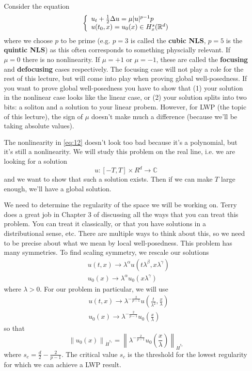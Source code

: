 \documentclass{article}
\def\R{\mathbb{R}} %
\newcommand\norm[1]{\left\lVert#1\right\rVert}
\begin{document}
Consider the equation
\begin{equation}\label{eq:12}
  \left\{ \begin{array}{l@{}l}
      u_{t}+ \frac{1}{2}\Delta u = \mu|u|^{p-1}p \\
      u(t_{0},x)=u_{0}(x)\in H_{x}^{s}(\R^d)
    \end{array}\right.
\end{equation}
where we choose $p$ to be prime (e.g. $p=3$ is called the \textbf{cubic NLS}, $p=5$ is
the \textbf{quintic NLS}) as this often corresponds to something physcially relevant. If
$\mu=0$ there is no nonlinearity. If $\mu=+1$ or $\mu=-1$, these are called the
\textbf{focusing} and \textbf{defocusing} cases respectively. The focusing case
will not play a role for the rest of this lecture, but will come into play when
proving global well-posedness. If you want to prove global well-posedness you
have to show that (1) your solution in the nonlinear case looks like the linear
case, or (2) your solution splits into two bits: a soliton and a solution to
your linear probem. However, for LWP (the topic of this lecture), the sign of
$\mu$ doesn't make much a difference (because we'll be taking absolute values).

The nonlinearity in \cref{eq:12} doesn't look too bad because it's a polynomial,
but it's still a nonlinearity. We will study this problem on the real line, i.e.
we are looking for a solution
\begin{equation*}
  u:[-T,T]\times R^{d} \to \mathbb{C}
\end{equation*}
and we want to show that such a solution exists. Then if we can make $T$ large
enough, we'll have a global solution.

We need to determine the regularity of the space we will be working on. Terry
does a great job in Chapter 3 of discussing all the ways that you can treat this
problem. You can treat it classically, or that you have solutions in a
distributional sense, etc. There are multiple ways to think about this, so we
need to be precise about what we mean by local well-posedness. This problem has
many symmetries. To find scaling symmetry, we rescale our solutions
\begin{align*}
  &u(t,x) \to \lambda^{\alpha}u(t\lambda^{\beta},x\lambda^{\gamma})\\
  &u_{0}(x) \to  \lambda^{\alpha}u_{0}(x\lambda^{\gamma})
\end{align*}
where $\lambda>0$. For our problem in particular, we will use
\begin{align*}
  &u(t,x) \to \lambda^{-\frac{2}{p-1}}u\left(\frac{t}{\lambda^{2}},\frac{x}{\lambda}\right)\\
  &u_{0}(x) \to \lambda^{-\frac{2}{p-1}}u_{0}\left( \frac{x}{\lambda} \right) 
\end{align*}
so that 
\begin{equation*}
  \norm{u_{0}(x)}_{\dot{H}^{s_{c}}} = \norm{\lambda^{-\frac{2}{p-1}}u_{0} \left( \frac{x}{\lambda} \right)}_{\dot{H}^{s_{c}}}
\end{equation*}
where $s_{c}= \frac{d}{2}-\frac{2}{p-1}$. The critical value $s_{c}$ is the
threshold for the lowest regularity for which we can achieve a LWP result.
\end{document}
